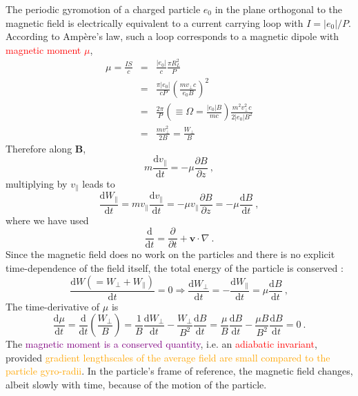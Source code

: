\documentclass[12pt,a4paper]{article}
\renewcommand{\vec}[1]{\boldsymbol{#1}}
\newcommand{\dif}{\mathrm{d}}
\begin{document}
The periodic gyromotion of a charged particle $e_0$ in the plane orthogonal to the magnetic field is electrically equivalent to a current carrying loop with $I = |e_0|/P$. According to Amp\`ere's law, such a loop corresponds to a magnetic dipole with \textcolor{red}{magnetic moment $\mu$},
\begin{eqnarray*}
\mu = \frac{IS}{c} &=& \frac{|e_0|}{c} \frac{\pi R_L^2}{P} \\
&=& \frac{\pi |e_0|}{cP} \left(\frac{mv_\perp c}{e_0 B}\right)^2 \\
&=& \frac{2\pi}{P} \left(\equiv \Omega = \frac{|e_0| B}{mc} \right) \frac{m^2 v^2_\perp c}{2|e_0| B^2} \\
&=& \frac{mv_\perp^2}{2B} = \frac{W_\perp}{B}
\end{eqnarray*}
Therefore along $\vec{B}$,
\begin{equation*}
m \frac{\dif v_\parallel}{\dif t} = -\mu \frac{\partial B}{\partial z} ~,
\end{equation*}
multiplying by $v_\parallel$ leads to
\begin{equation*}
\frac{\dif W_\parallel}{\dif t} = m v_\parallel\frac{\dif v_\parallel}{\dif t} = -\mu v_\parallel \frac{\partial B}{\partial z} = -\mu \frac{\dif B}{\dif t} ~,
\end{equation*}
where we have used
\begin{equation*}
\frac{\dif }{\dif t} = \frac{\partial }{\partial t} +\vec{v} \cdot \nabla ~.
\end{equation*}
Since the magnetic field does no work on the particles and there is no explicit time-dependence of the field itself, the total energy of the particle is conserved :
\begin{equation*}
\frac{\dif W (= W_\perp +W_\parallel)}{\dif t} = 0\Longrightarrow \frac{\dif W_\perp}{\dif t} = -\frac{\dif W_\parallel}{\dif t} = \mu \frac{\dif B}{\dif t} ~,
\end{equation*}
The time-derivative of $\mu$ is
\begin{equation*}
\frac{\dif \mu}{\dif t} = \frac{\dif }{\dif t} \left( \frac{W_\perp}{B} \right) = \frac{1}{B} \frac{\dif W_\perp}{\dif t} -\frac{W_\perp}{B^2} \frac{\dif B}{\dif t} = \frac{\mu}{B} \frac{\dif B}{\dif t} -\frac{\mu B}{B^2} \frac{\dif B}{\dif t} = 0 ~.
\end{equation*}
The \textcolor{purple}{magnetic moment is a conserved quantity}, i.e. an \textcolor{red}{adiabatic invariant}, provided \textcolor{orange}{gradient lengthscales of the average field are small compared to the particle gyro-radii}. In the particle's frame of reference, the magnetic field changes, albeit slowly with time, because of the motion of the particle.
\end{document}
